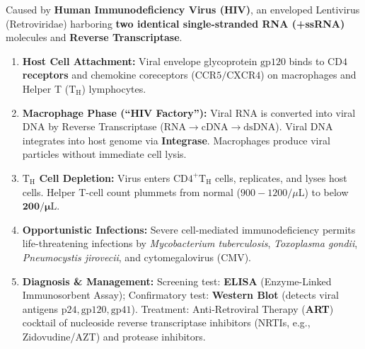 \documentclass[10pt,a4paper]{article}
\begin{document}
\begin{conceptbox}
Caused by \textbf{Human Immunodeficiency Virus (HIV)}, an enveloped Lentivirus (Retroviridae) harboring \textbf{two identical single-stranded RNA (+ssRNA)} molecules and \textbf{Reverse Transcriptase}.
\begin{enumerate}[leftmargin=*]
  \item \textbf{Host Cell Attachment:} Viral envelope glycoprotein $\mathbf{\mathrm{gp120}}$ binds to \textbf{$\mathrm{CD4}$ receptors} and chemokine coreceptors ($\mathrm{CCR5/CXCR4}$) on macrophages and Helper T ($\mathrm{T_H}$) lymphocytes.
  \item \textbf{Macrophage Phase (``HIV Factory''):} Viral RNA is converted into viral DNA by Reverse Transcriptase ($\text{RNA} \to \text{cDNA} \to \text{dsDNA}$). Viral DNA integrates into host genome via \textbf{Integrase}. Macrophages produce viral particles without immediate cell lysis.
  \item \textbf{$\mathrm{T_H}$ Cell Depletion:} Virus enters $\mathrm{CD4}^+ \mathrm{T_H}$ cells, replicates, and lyses host cells. Helper T-cell count plummets from normal ($900-1200/\mu\mathrm{L}$) to below $\mathbf{200/\mu\mathrm{L}}$.
  \item \textbf{Opportunistic Infections:} Severe cell-mediated immunodeficiency permits life-threatening infections by \textit{Mycobacterium tuberculosis}, \textit{Toxoplasma gondii}, \textit{Pneumocystis jirovecii}, and cytomegalovirus (CMV).
  \item \textbf{Diagnosis \& Management:} Screening test: \textbf{ELISA} (Enzyme-Linked Immunosorbent Assay); Confirmatory test: \textbf{Western Blot} (detects viral antigens $\mathrm{p24, gp120, gp41}$). Treatment: Anti-Retroviral Therapy (\textbf{ART}) cocktail of nucleoside reverse transcriptase inhibitors (NRTIs, e.g., Zidovudine/AZT) and protease inhibitors.
\end{enumerate}
\end{conceptbox}
\end{document}
